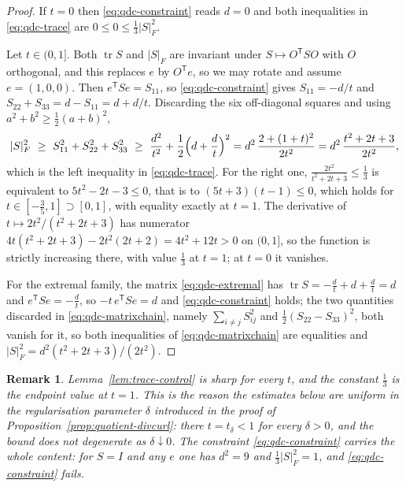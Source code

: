 \documentclass[11pt]{article}
\newtheorem{remark}[theorem]{Remark}
\theoremstyle{definition}
\theoremstyle{plain}
\begin{document}
\begin{proof}
If $t=0$ then \eqref{eq:qdc-constraint} reads $d=0$ and both inequalities in
\eqref{eq:qdc-trace} are $0\le0\le\frac13|S|_F^2$.

Let $t\in(0,1]$.  Both $\operatorname{tr}S$ and $|S|_F$ are invariant under
$S\mapsto O^{\mathsf T}SO$ with $O$ orthogonal, and this replaces $e$ by
$O^{\mathsf T}e$, so we may rotate and assume $e=(1,0,0)$.  Then
$e^{\mathsf T}Se=S_{11}$, so \eqref{eq:qdc-constraint} gives $S_{11}=-d/t$
and $S_{22}+S_{33}=d-S_{11}=d+d/t$.  Discarding the six off-diagonal
squares and using $a^2+b^2\ge\frac12(a+b)^2$,
\begin{equation}\label{eq:qdc-matrixchain}
 |S|_F^2\ \ge\ S_{11}^2+S_{22}^2+S_{33}^2
 \ \ge\ \frac{d^2}{t^2}+\frac12\Bigl(d+\frac dt\Bigr)^2
 =d^2\,\frac{2+(1+t)^2}{2t^2}
 =d^2\,\frac{t^2+2t+3}{2t^2},
\end{equation}
which is the left inequality in \eqref{eq:qdc-trace}.  For the right one,
$\frac{2t^2}{t^2+2t+3}\le\frac13$ is equivalent to $5t^2-2t-3\le0$, that is
to $(5t+3)(t-1)\le0$, which holds for $t\in[-\frac35,1]\supset[0,1]$, with
equality exactly at $t=1$.  The derivative of
$t\mapsto2t^2/(t^2+2t+3)$ has numerator
$4t(t^2+2t+3)-2t^2(2t+2)=4t^2+12t>0$ on $(0,1]$, so the function is
strictly increasing there, with value $\frac13$ at $t=1$; at $t=0$ it
vanishes.

For the extremal family, the matrix \eqref{eq:qdc-extremal} has
$\operatorname{tr}S=-\frac dt+d+\frac dt=d$ and $e^{\mathsf T}Se=-\frac dt$,
so $-t\,e^{\mathsf T}Se=d$ and \eqref{eq:qdc-constraint} holds; the two
quantities discarded in \eqref{eq:qdc-matrixchain}, namely
$\sum_{i\ne j}S_{ij}^2$ and $\frac12(S_{22}-S_{33})^2$, both vanish for it,
so both inequalities of \eqref{eq:qdc-matrixchain} are equalities and
$|S|_F^2=d^2(t^2+2t+3)/(2t^2)$.
\end{proof}

\begin{remark}\label{rem:qdc-sharp}
Lemma~\ref{lem:trace-control} is sharp for every $t$, and the constant
$\frac13$ is the endpoint value at $t=1$.  This is the reason the estimates
below are uniform in the regularisation parameter $\delta$ introduced in the
proof of Proposition~\ref{prop:quotient-divcurl}: there $t=t_\delta<1$ for
every $\delta>0$, and the bound does not degenerate as $\delta\downarrow0$.
The constraint \eqref{eq:qdc-constraint} carries the whole content: for
$S=I$ and any $e$ one has $d^2=9$ and $\frac13|S|_F^2=1$, and
\eqref{eq:qdc-constraint} fails.
\end{remark}
\end{document}
